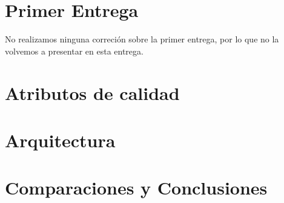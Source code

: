 \documentclass[a4paper]{article}
\begin{document}
\section{Primer Entrega}
No realizamos ninguna correción sobre la primer entrega, por lo que no la volvemos a presentar en esta
entrega.
\newpage
\section{Atributos de calidad}

\section{Arquitectura}

% 
\section{Comparaciones y Conclusiones}


\newpage



\end{document}
